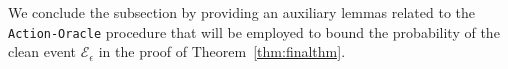 %
%


We conclude the subsection by providing an auxiliary lemmas related to the \texttt{Action-Oracle} procedure that will be employed to bound the probability of the clean event $\mathcal{E}_\epsilon$ in the proof of Theorem~\ref{thm:finalthm}.


